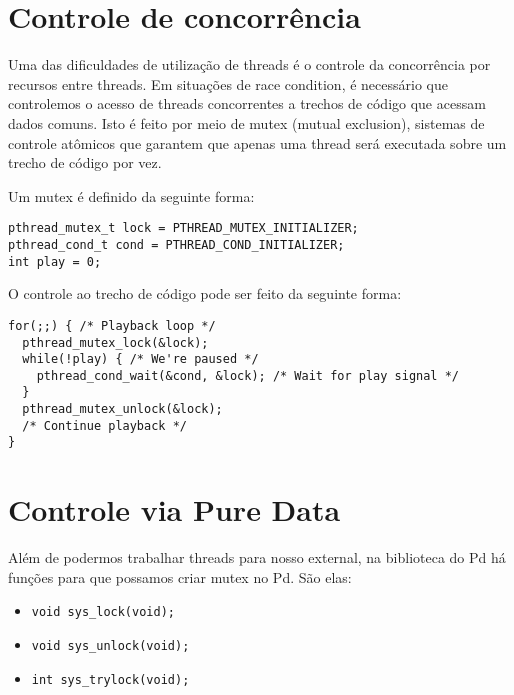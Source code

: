 \section{Controle de concorrência}

Uma das dificuldades de utilização de threads é o controle da concorrência por
recursos entre threads. Em situações de race condition, é necessário que
controlemos o acesso de threads concorrentes a trechos de código que acessam
dados comuns. Isto é feito por meio de mutex (mutual exclusion), sistemas de
controle atômicos que garantem que apenas uma thread será executada sobre um
trecho de código por vez.

Um mutex é definido da seguinte forma:

\begin{lstlisting}
pthread_mutex_t lock = PTHREAD_MUTEX_INITIALIZER;
pthread_cond_t cond = PTHREAD_COND_INITIALIZER;
int play = 0;
\end{lstlisting}

O controle ao trecho de código pode ser feito da seguinte forma:

\begin{lstlisting}
for(;;) { /* Playback loop */
  pthread_mutex_lock(&lock);
  while(!play) { /* We're paused */
    pthread_cond_wait(&cond, &lock); /* Wait for play signal */
  }
  pthread_mutex_unlock(&lock);
  /* Continue playback */
}
\end{lstlisting}


\section{Controle via Pure Data}
Além de podermos trabalhar threads para nosso external, na biblioteca do
Pd há funções para que possamos criar mutex no Pd. São elas:


\begin{itemize}
\item \texttt{void sys\_lock(void);}
\item \texttt{void sys\_unlock(void);}
\item \texttt{int sys\_trylock(void);}
\end{itemize}
